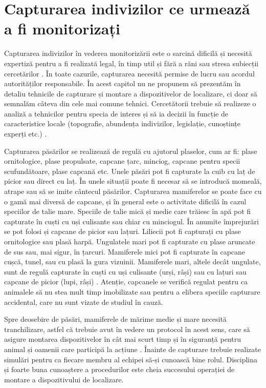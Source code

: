 \documentclass[11pt,onehalfspacing]{elife}
\begin{document}
\section{Capturarea indivizilor ce urmează a fi monitorizați}

Capturarea indivizilor în vederea monitorizării este o sarcină dificilă și necesită expertiză pentru a fi realizată legal, în timp util și fără a răni sau stresa subiecții cercetărilor \citep{Hooten2017, Sikes2016}. În toate cazurile, capturarea necesită permise de lucru sau acordul autorităților responsabile. În acest capitol nu ne propunem să prezentăm în detaliu tehnicile de capturare și montare a dispozitivelor de localizare, ci doar să semnalăm câteva din cele mai comune tehnici. Cercetătorii trebuie să realizeze o analiză a tehnicilor pentru specia de interes și să ia decizii în funcție de caracteristice locale (topografie, abundența indivizilor, legislație, cunoștințe experți etc.) \citep{Silvy2012}.

Capturarea păsărilor se realizează de regulă cu ajutorul plaselor, cum ar fi: plase ornitologice, plase propulsate, capcane țarc, minciog, capcane pentru specii scufundătoare, plase capcană etc. Unele păsări pot fi capturate la cuib cu laț de picior sau direct cu laț. În unele situații poate fi necesar să se introducă momeală, atrape sau să se imite cântecul păsărilor. Capturarea mamiferelor se poate face cu o gamă mai diversă de capcane, și în general este o activitate dificilă în cazul speciilor de talie mare. Speciile de talie mică și medie care trăiesc în apă pot fi capturate în cuști cu uși culisante sau chiar cu minciogul. În anumite împrejurări se pot folosi și capcane de picior sau lațuri. Liliecii pot fi capturați cu plase ornitologice sau plasă harpă. Ungulatele mari pot fi capturate cu plase aruncate de sus sau, mai sigur, în țarcuri. Mamiferele mici pot fi capturate în capcane cușcă, tunel, sau cu plasă la gura vizuinii. Mamiferele mari, altele decât ungulate, sunt de regulă capturate în cuști cu uși culisante (urși, râși) sau cu lațuri sau capcane de picior (lupi, râși) \citep{White2012, Silvy2012}. Atenție, capcanele se verifică regulat pentru ca animalele să nu stea mult timp imobilizate sau pentru a elibera speciile capturare accidental, care nu sunt vizate de studiul în cauză.

Spre deosebire de păsări, mamiferele de mărime medie și mare necesită tranchilizare, astfel că trebuie avut în vedere un protocol în acest sens, care să asigure montarea dispozitivelor în cât mai scurt timp și în siguranță pentru animal și oamenii care participă la acțiune \citep{Sikes2016}. Înainte de capturare trebuie realizate simulări pentru ca fiecare membru al echipei să-și cunoască bine rolul. Disciplina și foarte buna cunoaștere a procedurilor este cheia succesului operației de montare a dispozitivului de localizare.
\end{document}
